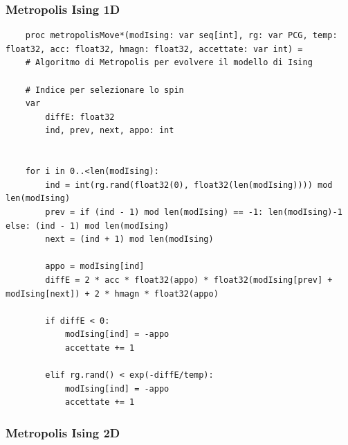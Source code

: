 \subsubsection{Metropolis Ising 1D}

\begin{verbatim}
    proc metropolisMove*(modIsing: var seq[int], rg: var PCG, temp: float32, acc: float32, hmagn: float32, accettate: var int) = 
    # Algoritmo di Metropolis per evolvere il modello di Ising

    # Indice per selezionare lo spin
    var 
        diffE: float32
        ind, prev, next, appo: int


    for i in 0..<len(modIsing):
        ind = int(rg.rand(float32(0), float32(len(modIsing)))) mod len(modIsing)
        prev = if (ind - 1) mod len(modIsing) == -1: len(modIsing)-1 else: (ind - 1) mod len(modIsing)
        next = (ind + 1) mod len(modIsing)

        appo = modIsing[ind]
        diffE = 2 * acc * float32(appo) * float32(modIsing[prev] + modIsing[next]) + 2 * hmagn * float32(appo)

        if diffE < 0:
            modIsing[ind] = -appo
            accettate += 1

        elif rg.rand() < exp(-diffE/temp):
            modIsing[ind] = -appo
            accettate += 1
\end{verbatim}    



\subsubsection{Metropolis Ising 2D}

